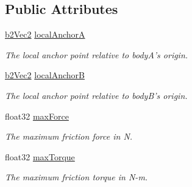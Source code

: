 \subsection*{Public Attributes}
\begin{DoxyCompactItemize}
\item 
\hypertarget{structb2_friction_joint_def_a00b246e60ae282a956a42b662993e92a}{\hyperlink{structb2_vec2}{b2\-Vec2} \hyperlink{structb2_friction_joint_def_a00b246e60ae282a956a42b662993e92a}{local\-Anchor\-A}}\label{structb2_friction_joint_def_a00b246e60ae282a956a42b662993e92a}

\begin{DoxyCompactList}\small\item\em The local anchor point relative to body\-A's origin. \end{DoxyCompactList}\item 
\hypertarget{structb2_friction_joint_def_ad6d5a5614a7ac77b13e53fda3e32ed05}{\hyperlink{structb2_vec2}{b2\-Vec2} \hyperlink{structb2_friction_joint_def_ad6d5a5614a7ac77b13e53fda3e32ed05}{local\-Anchor\-B}}\label{structb2_friction_joint_def_ad6d5a5614a7ac77b13e53fda3e32ed05}

\begin{DoxyCompactList}\small\item\em The local anchor point relative to body\-B's origin. \end{DoxyCompactList}\item 
\hypertarget{structb2_friction_joint_def_ad30e97a80790d4ca64bac7a1fa7d1b35}{float32 \hyperlink{structb2_friction_joint_def_ad30e97a80790d4ca64bac7a1fa7d1b35}{max\-Force}}\label{structb2_friction_joint_def_ad30e97a80790d4ca64bac7a1fa7d1b35}

\begin{DoxyCompactList}\small\item\em The maximum friction force in N. \end{DoxyCompactList}\item 
\hypertarget{structb2_friction_joint_def_a61adfb0ee7c0ed4cb8feee8304c16ef6}{float32 \hyperlink{structb2_friction_joint_def_a61adfb0ee7c0ed4cb8feee8304c16ef6}{max\-Torque}}\label{structb2_friction_joint_def_a61adfb0ee7c0ed4cb8feee8304c16ef6}

\begin{DoxyCompactList}\small\item\em The maximum friction torque in N-\/m. \end{DoxyCompactList}\end{DoxyCompactItemize}


